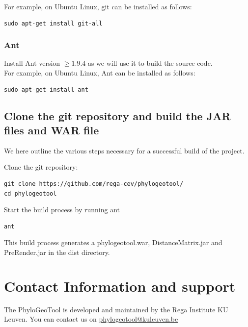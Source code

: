 \documentclass[a4paper, 11pt]{article} %
\begin{document}
\noindent For example, on Ubuntu Linux, git can be installed as follows:
\begin{verbatim}
sudo apt-get install git-all
\end{verbatim}

\subsubsection*{Ant}
Install Ant version $\geq 1.9.4$ as we will use it to build the source code.\\

\noindent For example, on Ubuntu Linux, Ant can be installed as follows:
\begin{verbatim}
sudo apt-get install ant
\end{verbatim}

\subsection{Clone the git repository and build the JAR files and WAR file}
We here outline the various steps necessary for a successful build of the project.
\begin{itemize}
\item {Clone the git repository: 
\begin{verbatim}
git clone https://github.com/rega-cev/phylogeotool/
cd phylogeotool
\end{verbatim}
\item{Start the build process by running ant}
\begin{verbatim}
ant
\end{verbatim}
\item This build process generates a phylogeotool.war, DistanceMatrix.jar and PreRender.jar in the dist directory.
}
\end{itemize}


\section{Contact Information and support }


The PhyloGeoTool is developed and maintained by the Rega Institute KU Leuven.
You can contact us on \href{mailto:phylogeotool@kuleuven.be}{phylogeotool@kuleuven.be}
\end{document}
